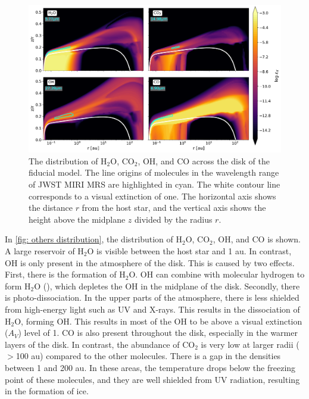 \documentclass[oneside, single, authoryear, semicolon, 12pt]{lion-msc}
\newcommand{\4}{$_4$}
\newcommand{\3}{$_3$}
\newcommand{\2}{$_2$}
\begin{document}
\begin{figure}[H]
    \centering
    \includegraphics[width=\linewidth]{Figures/Abundance1.pdf}
    \caption{The distribution of H\2O, CO\2, OH, and CO across the disk of the fiducial model. The line origins of molecules in the wavelength range of JWST MIRI MRS are highlighted in cyan. The white contour line corresponds to a visual extinction of one. The horizontal axis shows the distance $r$ from the host star, and the vertical axis shows the height above the midplane $z$ divided by the radius $r$.}
    \label{fig: others distribution}
\end{figure}

In \autoref{fig: others distribution}, the distribution of H\2O, CO\2, OH, and CO is shown. A large reservoir of H\2O is visible between the host star and 1 au. In contrast, OH is only present in the atmosphere of the disk. This is caused by two effects. First, there is the formation of H\2O. OH can combine with molecular hydrogen to form H\2O (), which depletes the OH in the midplane of the disk. Secondly, there is photo-dissociation. In the upper parts of the atmosphere, there is less shielded from high-energy light such as UV and X-rays. This results in the dissociation of H\2O, forming OH. This results in most of the OH to be above a visual extinction ($A_V$) level of 1. CO is also present throughout the disk, especially in the warmer layers of the disk. In contrast, the abundance of CO\2 is very low at larger radii ($>$100 au) 
compared to the other molecules. There is a gap in the densities between 1 and 200 au. In these areas, the temperature drops below the freezing point of these molecules, and they are well shielded from UV radiation, resulting in the formation of ice. 
\end{document}
